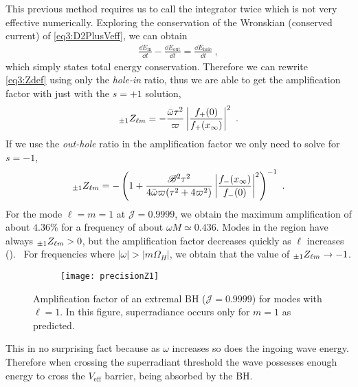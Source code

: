 This previous method requires us to call the integrator twice which is not very effective numerically.
Exploring the conservation of the Wronskian (conserved current) of \eqref{eq3:D2PlusVeff}, we can obtain \cite{Teukolsky1974}
\begin{align}
	\label{eq4:InOutHole}
	\frac{\dd E_\mathrm{in}}{\dd t} - \frac{\dd E_\mathrm{out}}{\dd t} = \frac{\dd E_\mathrm{hole}}{\dd t} ~,
\end{align}
which simply states total energy conservation.
Therefore we can rewrite \eqref{eq3:Zdef} using only the \emph{hole-in} ratio, thus we are able to get the amplification factor with just with the $s=+1$ solution,
\begin{align}
	\label{eq4:ZFPlusPlus}
	\uu[\pm 1]{Z}{\ell m} = - \frac{\bar{\omega} \tau^2}{\varpi} \left|\frac{f_{+}(0)}{f_{+}(x_\infty)}\right|^2 ~.
\end{align}
If we use the \emph{out-hole} ratio in the amplification factor we only need to solve for $s=-1$,
\begin{align}
	\label{eq4:ZFMinusMinus}
	\uu[\pm 1]{Z}{\ell m} = - \left( 1 + \frac{\mathscr{B}^2 \tau^2}{4 \bar{\omega} \varpi(\tau^2 + 4 \varpi^2)} \left|\frac{f_{-}(x_\infty)}{f_{-}(0)}\right|^2 \right)^{-1} ~.
\end{align}
For the mode $\ell=m=1$ at $\mathscr{J}=0.9999$, we obtain the maximum amplification of about $4.36\%$ for a frequency of about $\omega M \simeq 0.436$.
Modes in the region  have always $\uu[\pm 1]{Z}{\ell m}>0$, but the amplification factor decreases quickly as $\ell$ increases ().~
For frequencies where $|\omega|>|m\Omega_H|$, we obtain that the value of $\uu[\pm 1]{Z}{\ell m} \to -1$.
\begin{figure}[h]
	\centering
	\vspace{0.2cm}
	\begin{subfigure}[c]{0.6\textwidth}
        \texttt{[image: precisionZ1]}
	\end{subfigure}
	\caption{Amplification factor of an extremal BH ($\mathscr{J}=0.9999$) for modes with $\ell=1$. In this figure, superradiance occurs only for $m=1$ as predicted.}
	\label{fig4:plotZ11}
\end{figure}
This in no surprising fact because as $\omega$ increases so does the ingoing wave energy. Therefore when crossing the superradiant threshold the wave possesses enough energy to cross the $V_\mathrm{eff}$ barrier, being absorbed by the BH.

